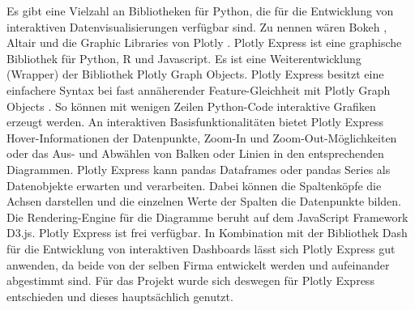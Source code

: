     
    Es gibt eine Vielzahl an Bibliotheken für Python, die für die Entwicklung von interaktiven Datenvisualisierungen verfügbar sind. Zu
    nennen wären Bokeh \cite[vgl.][]{van_de_ven_bokeh_2021}, Altair \cite[vgl.][]{altair_altair_2021} und die 
    Graphic Libraries von Plotly \cite[vgl.][]{plotly_plotly_2021}.
    Plotly Express ist eine graphische Bibliothek für Python, \textsf{R} und Javascript. Es ist eine Weiterentwicklung (Wrapper) der Bibliothek Plotly Graph Objects. 
    Plotly Express besitzt eine einfachere Syntax bei fast annäherender Feature-Gleichheit mit Plotly Graph Objects \cite[][]{plotly_plotly_2021}.
    So können mit wenigen Zeilen Python-Code interaktive Grafiken erzeugt werden. 
    An interaktiven Basisfunktionalitäten bietet Plotly Express Hover-Informationen der Datenpunkte, Zoom-In und Zoom-Out-Möglichkeiten oder
    das Aus- und Abwählen von Balken oder Linien in den entsprechenden Diagrammen. Plotly Express kann pandas Dataframes 
    oder pandas Series als Datenobjekte erwarten und verarbeiten. Dabei können die Spaltenköpfe die Achsen darstellen 
    und die einzelnen Werte der Spalten die Datenpunkte bilden. Die Rendering-Engine für die Diagramme beruht auf dem JavaScript Framework D3.js. 
    Plotly Express ist frei verfügbar. In Kombination mit der Bibliothek Dash für die Entwicklung von interaktiven Dashboards lässt sich Plotly Express gut anwenden, 
    da beide von der selben Firma entwickelt werden und aufeinander abgestimmt sind.  Für das Projekt wurde sich deswegen für Plotly Express entschieden 
    und dieses hauptsächlich genutzt. 
    

